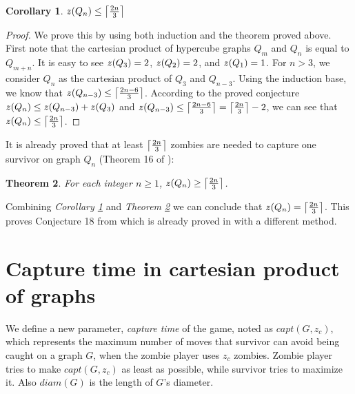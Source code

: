 \documentclass[1p]{elsarticle}
\DeclarePairedDelimiter\ceil{\lceil}{\rceil} \DeclarePairedDelimiter\floor{\lfloor}{\rfloor}
\newtheorem{theorem}{Theorem}
\newtheorem{corollary}[theorem]{Corollary}
\newcommand{\zn}{\ooalign{$z$\cr\hfil\rule[.5ex]{.2em}{.08ex}\hfil\cr}}
\begin{document}
\begin{corollary}
	\label{C3}
	$\zn(Q_{n}) \leq \ceil*{\frac{2n}{3}}$
\end{corollary}
\begin{proof}
	We prove this by using both induction and the theorem proved above. First note that the cartesian product of
	hypercube graphs $Q_{m}$ and $Q_{n}$ is equal to $Q_{m+n}$. It is easy to see $\zn(Q_3) = 2$, $\zn(Q_2) = 2$, and
	$\zn(Q_1) = 1$. For $n > 3$, we consider $Q_n$ as the cartesian product of $Q_3$ and $Q_{n-3}$. Using the induction
	base, we know that $\zn(Q_{n-3}) \leq \ceil*{\frac{2n - 6}{3}}$. According to the proved conjecture $\zn(Q_n) \leq
	\zn(Q_{n-3}) + \zn(Q_3)$ and $\zn(Q_{n-3}) \leq \ceil*{\frac{2n - 6}{3}} = \ceil*{\frac{2n}{3}} - 2$, we can see that
	$\zn(Q_n) \leq \ceil*{\frac{2n}{3}}$.
\end{proof}

It is already proved that at least $\ceil*{\frac{2n}{3}}$ zombies are needed to capture one survivor on graph $Q_n$
(Theorem 16 of \cite{Fitz16}):

\begin{theorem}
	\label{T4}
	For each integer $n \geq 1$, $\zn(Q_n) \geq \ceil*{\frac{2n}{3}} $.
\end{theorem}

Combining {\it Corollary \ref{C3}} and {\it Theorem \ref{T4}} we can conclude that $\zn(Q_n) = \ceil*{\frac{2n}{3}}$.
This proves Conjecture 18 from \cite{Fitz16} which is already proved in \cite{Offner19} with a different method. 
	

\section{Capture time in cartesian product of graphs}\label{capturetime}
	We define a new parameter, {\it capture time} of the game, noted as $capt(G,z_c)$, which represents the maximum
	number of moves that survivor can avoid being caught on a graph $G$, when the zombie player uses $z_c$ zombies. Zombie
	player tries to make $capt(G,z_c)$ as least as possible, while survivor tries to maximize it. Also $diam(G)$ is the
	length of $G$'s diameter.
\end{document}
